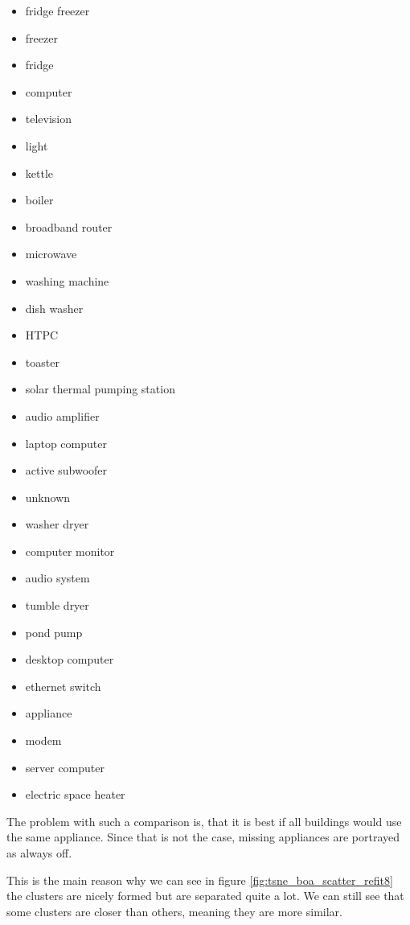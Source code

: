 \begin{itemize}
	\item fridge freezer
	\item freezer
	\item fridge
	\item computer
	\item television
	\item light
	\item kettle
	\item boiler
	\item broadband router
	\item microwave
	\item washing machine
	\item dish washer
	\item HTPC
	\item toaster
	\item solar thermal pumping station
	\item audio amplifier
	\item laptop computer
	\item active subwoofer
	\item unknown
	\item washer dryer
	\item computer monitor
	\item audio system
	\item tumble dryer
	\item pond pump
	\item desktop computer
	\item ethernet switch
	\item appliance
	\item modem
	\item server computer
	\item electric space heater
\end{itemize}

The problem with such a comparison is, that it is best 
if all buildings would use the same appliance.
Since that is not the case, missing appliances are portrayed as always off. 

This is the main reason why we can see in figure \ref{fig:tsne_boa_scatter_refit8} the clusters are nicely formed
but are separated quite a lot. We can still see that some clusters are closer than others,
meaning they are more similar.

